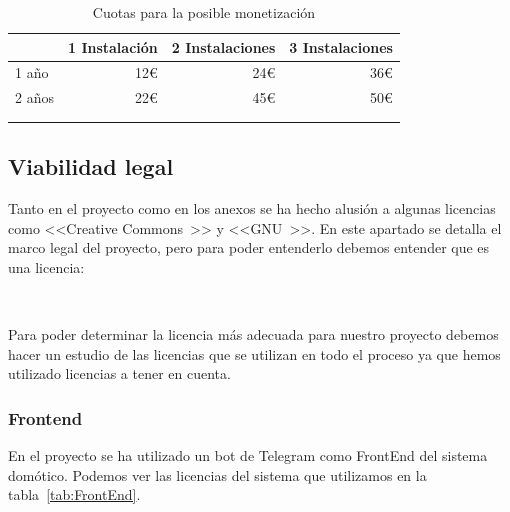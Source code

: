 \begin{longtable}[c]{@{}lrrr@{}}
\toprule
\centering
\multicolumn{1}{c}{\textbf{Tiempo}} & \multicolumn{1}{c}{\textbf{1 Instalación}} & \multicolumn{1}{c}{\textbf{2 Instalaciones}} & \multicolumn{1}{c}{\textbf{3 Instalaciones}}\\* \midrule
\endfirsthead
%
\endhead
%
\bottomrule
\endfoot
%
\endlastfoot
%
1 año & 12€ & 24€ & 36€ \\
2 años & 22€ & 45€ & 50€ \\ \bottomrule \\
\caption{Cuotas para la posible monetización}
\label{tab:Cuotas1}
\end{longtable}

\subsection{Viabilidad legal}
Tanto en el proyecto como en los anexos se ha hecho alusión a algunas licencias como <<Creative Commons~\cite{wiki:Creative}>> y <<GNU~\cite{manual:GNU}>>. En este apartado se detalla el marco legal del proyecto, pero para poder entenderlo debemos entender que es una licencia:

\begin{displayquote}
~\cite{misc:WikiLicencia}
\end{displayquote}

Para poder determinar la licencia más adecuada para nuestro proyecto debemos hacer un estudio de las licencias que se utilizan en todo el proceso ya que hemos utilizado licencias a tener en cuenta.

\subsubsection{Frontend}
En el proyecto se ha utilizado un bot de Telegram como FrontEnd del sistema domótico. Podemos ver las licencias del sistema que utilizamos en la tabla~\ref{tab:FrontEnd}.

